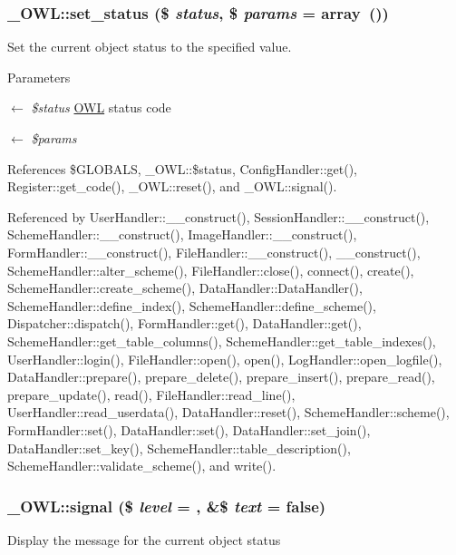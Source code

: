 \subsubsection[{set\_\-status}]{\setlength{\rightskip}{0pt plus 5cm}\_\-OWL::set\_\-status (\$ {\em status}, \/  \$ {\em params} = {\ttfamily array~()})}\label{class__OWL_aea912d0ede9b3c2a69b79072d94d4787}
Set the current object status to the specified value.


\begin{DoxyParams}{Parameters}
\item[\mbox{$\leftarrow$} {\em \$status}]\hyperlink{classOWL}{OWL} status code \item[\mbox{$\leftarrow$} {\em \$params}]\end{DoxyParams}


References \$GLOBALS, \_\-OWL::\$status, ConfigHandler::get(), Register::get\_\-code(), \_\-OWL::reset(), and \_\-OWL::signal().



Referenced by UserHandler::\_\-\_\-construct(), SessionHandler::\_\-\_\-construct(), SchemeHandler::\_\-\_\-construct(), ImageHandler::\_\-\_\-construct(), FormHandler::\_\-\_\-construct(), FileHandler::\_\-\_\-construct(), \_\-\_\-construct(), SchemeHandler::alter\_\-scheme(), FileHandler::close(), connect(), create(), SchemeHandler::create\_\-scheme(), DataHandler::DataHandler(), SchemeHandler::define\_\-index(), SchemeHandler::define\_\-scheme(), Dispatcher::dispatch(), FormHandler::get(), DataHandler::get(), SchemeHandler::get\_\-table\_\-columns(), SchemeHandler::get\_\-table\_\-indexes(), UserHandler::login(), FileHandler::open(), open(), LogHandler::open\_\-logfile(), DataHandler::prepare(), prepare\_\-delete(), prepare\_\-insert(), prepare\_\-read(), prepare\_\-update(), read(), FileHandler::read\_\-line(), UserHandler::read\_\-userdata(), DataHandler::reset(), SchemeHandler::scheme(), FormHandler::set(), DataHandler::set(), DataHandler::set\_\-join(), DataHandler::set\_\-key(), SchemeHandler::table\_\-description(), SchemeHandler::validate\_\-scheme(), and write().

\subsubsection[{signal}]{\setlength{\rightskip}{0pt plus 5cm}\_\-OWL::signal (\$ {\em level} = {}, \/  \&\$ {\em text} = {\ttfamily false})}\label{class__OWL_a51ba4a16409acf2a2f61f286939091a5}
Display the message for the current object status


